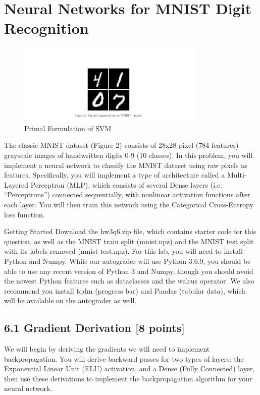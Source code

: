 \documentclass[a3paper,12pt]{extarticle} %
\begin{document}
\section{Neural Networks for MNIST Digit Recognition}
\begin{figure}
    \centering
    \includegraphics[width=0.8\textwidth]{msit.png}
    \caption{Primal Formulation of SVM}
    \label{fig:primal}
\end{figure}
The classic MNIST dataset (Figure 2) consists of 28x28 pixel (784 features) grayscale images of handwritten
digits 0-9 (10 classes).
In this problem, you will implement a neural network to classify the MNIST dataset using raw pixels as
features. Specifically, you will implement a type of architecture called a Multi-Layered Perceptron (MLP),
which consists of several Dense layers (i.e. “Perceptrons”) connected sequentially, with nonlinear activation
functions after each layer. You will then train this network using the Categorical Cross-Entropy loss function.

Getting Started Download the hw3q6.zip file, which contains starter code for this question, as well as
the MNIST train split (mnist.npz) and the MNIST test split with its labels removed (mnist test.npz).
For this lab, you will need to install Python and Numpy. While our autograder will use Python 3.6.9, you
should be able to use any recent version of Python 3 and Numpy, though you should avoid the newest Python
features such as dataclasses and the walrus operator. We also recommend you install tqdm (progress bar)
and Pandas (tabular data), which will be available on the autograder as well.


\subsection*{6.1 Gradient Derivation [8 points]}
We will begin by deriving the gradients we will need to implement backpropagation. You will derive backward passes for two types of layers: the Exponential Linear Unit (ELU) activation, and a Dense (Fully Connected) layer, then use these derivations to implement the backpropagation algorithm for your neural network.
\end{document}
